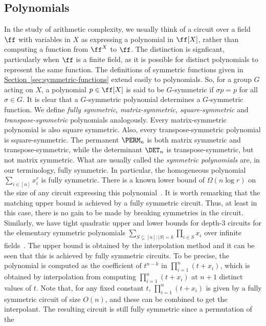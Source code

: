 \documentclass[11pt]{article}
\newcommand{\expref}[2]{\texorpdfstring{\hyperref[#2]{#1~\ref{#2}}}{#1~\ref{#2}}}
\begin{document}
\subsection{Polynomials}\label{sec:polynomials}
In the study of arithmetic complexity, we usually think of a circuit over a
field $\ff$ with variables in $X$ as expressing a polynomial in $\ff[X]$, rather
than computing a function from $\ff^X$ to $\ff$. The distinction is signficant,
particularly when $\ff$ is a finite field, as it is possible for distinct
polynomials to represent the same function.
The definitions of symmetric functions given in
\expref{Section}{sec:symmetric-functions} extend easily to polynomials. So, for a
group $G$ acting on $X$, a polynomial $p \in \ff[X]$ is said to be $G$-symmetric
if $\sigma p = p$ for all $\sigma \in G$.   It is clear that a $G$-symmetric polynomial
determines a $G$-symmetric function.  We define \emph{fully symmetric},
\emph{matrix-symmetric}, \emph{square-symmetric} and \emph{transpose-symmetric}
polynomials analogously. Every matrix-symmetric polynomial is also square
symmetric. Also, every transpose-symmetric polynomial is square-symmetric. The
permanent $\PERM_n$ is both matrix symmetric and transpose-symmetric, while the
determinant $\DET_n$ is transpose-symmetric, but not matrix symmetric.
What are usually called the \emph{symmetric polynomials} are, in our
terminology, fully symmetric. In particular, the homogeneous polynomial $\sum_{i
  \in [n]}x_i^r$ is fully symmetric. There is a known lower bound of $\Omega(n
\log r)$ on the size of any circuit expressing this polynomial~\cite{BaurS83}.
It is worth remarking that the matching upper bound is achieved by a fully symmetric
circuit. Thus, at least in this case, there is no gain to be made by breaking
symmetries in the circuit.  Similarly, we have tight quadratic upper and lower
bounds for depth-3 circuits for the elementary symmetric polynomials $\sum_{S \subseteq [n] : |S|=k}\prod_{i\in
  S}x_i$ over infinite fields~\cite{ShpilkaW01}.  The upper
bound is obtained  by the interpolation method and it can be seen that this is achieved by
fully symmetric circuits.  To be precise, the polynomial is computed
as the coefficient of $t^{n-k}$ in $\prod_{i=1}^n (t+x_i)$, which is
obtained by interpolation from computing $\prod_{i=1}^n (t+x_i)$ at
$n+1$ distinct values of $t$.  Note that, for any fixed constant $t$,
$\prod_{i=1}^n (t+x_i)$ is given by a fully symmetric circuit of size
$O(n)$, and these can be combined to get the interpolant.  The
resulting circuit is still fully symmetric since a permutation of the
\end{document}
